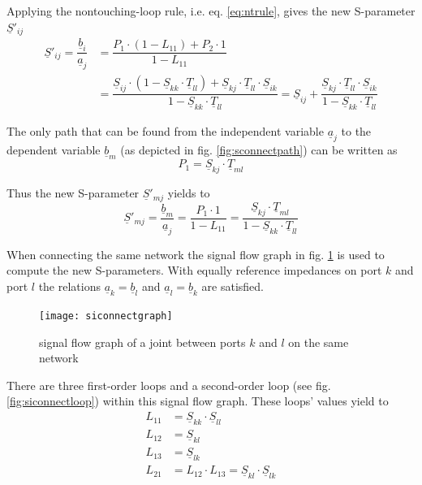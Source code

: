 \documentclass[10pt]{report}
\begin{document}
Applying the nontouching-loop rule, i.e. eq. \eqref{eq:ntrule}, gives
the new S-parameter $\underline{S}'_{ij}$
\begin{equation}
\begin{split}
\underline{S}'_{ij} = \dfrac{\underline{b}_{i}}{\underline{a}_{j}} &= \dfrac{P_{1}\cdot\left(1 - L_{11}\right) + P_{2}\cdot 1}{1 - L_{11}}\\
&= \dfrac{\underline{S}_{ij}\cdot\left(1 - \underline{S}_{kk}\cdot \underline{T}_{ll}\right) + \underline{S}_{kj}\cdot \underline{T}_{ll}\cdot \underline{S}_{ik}}{1 - \underline{S}_{kk}\cdot \underline{T}_{ll}}
= \underline{S}_{ij} + \dfrac{\underline{S}_{kj}\cdot \underline{T}_{ll}\cdot \underline{S}_{ik}}{1 - \underline{S}_{kk}\cdot \underline{T}_{ll}}
\end{split}
\end{equation}

The only path that can be found from the independent variable
$\underline{a}_{j}$ to the dependent variable $\underline{b}_{m}$ (as
depicted in fig. \ref{fig:sconnectpath}) can be written as
\begin{equation}
P_{1} = \underline{S}_{kj}\cdot \underline{T}_{ml}
\end{equation}

Thus the new S-parameter $\underline{S}'_{mj}$ yields to
\begin{equation}
\underline{S}'_{mj} = \dfrac{\underline{b}_{m}}{\underline{a}_{j}}
= \dfrac{P_{1}\cdot 1}{1 - L_{11}}
= \dfrac{\underline{S}_{kj}\cdot \underline{T}_{ml}}{1 - \underline{S}_{kk}\cdot \underline{T}_{ll}}
\end{equation}

When connecting the same network the signal flow graph in
fig. \ref{fig:siconnectgraph} is used to compute the new S-parameters.
With equally reference impedances on port $k$ and port $l$ the
relations $\underline{a}_{k} = \underline{b}_{l}$ and
$\underline{a}_{l} = \underline{b}_{k}$ are satisfied.

\begin{figure}[ht]
\begin{center}
\texttt{[image: siconnectgraph]}
\end{center}
\caption{signal flow graph of a joint between ports $k$ and $l$ on the same network}
\label{fig:siconnectgraph}
\end{figure}
\FloatBarrier

There are three first-order loops and a second-order loop (see
fig. \ref{fig:siconnectloop}) within this signal flow graph.  These
loops' values yield to
\begin{align}
L_{11} &= \underline{S}_{kk}\cdot \underline{S}_{ll}\\
L_{12} &= \underline{S}_{kl}\\
L_{13} &= \underline{S}_{lk}\\
L_{21} &= L_{12}\cdot L_{13} = \underline{S}_{kl}\cdot \underline{S}_{lk}
\end{align}
\end{document}
